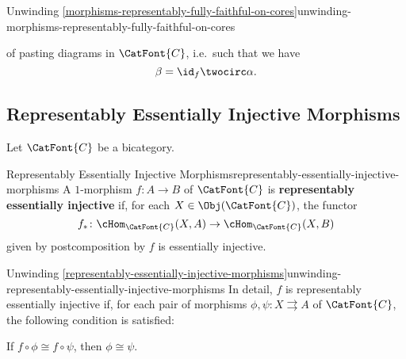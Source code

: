 \begin{remark}{Unwinding \cref{morphisms-representably-fully-faithful-on-cores}}{unwinding-morphisms-representably-fully-faithful-on-cores}
\begin{enumerate}
\begin{webcompile}
\begin{tikzcd}[row sep={5.0*\the\DL,between origins}, column sep={5.0*\the\DL,between origins}, background color=backgroundColor, ampersand replacement=\&]
                    \end{tikzcd}
                \end{webcompile}
                of pasting diagrams in $\CatFont{C}$, i.e.\ such that we have
                \[
                    \beta%
                    =%
                    \id_{f}\twocirc\alpha.%
                \]%
    \end{enumerate}
\end{remark}
\subsection{Representably Essentially Injective Morphisms}\label{subsection-representably-essentially-injective-morphisms}
Let $\CatFont{C}$ be a bicategory.
\begin{definition}{Representably Essentially Injective Morphisms}{representably-essentially-injective-morphisms}%
    A $1$-morphism $f\colon A\to B$ of $\CatFont{C}$ is \textbf{representably essentially injective} if, for each $X\in\Obj(\CatFont{C})$, the functor
    \[
        f_{*}%
        \colon%
        \cHom_{\CatFont{C}}(X,A)%
        \to%
        \cHom_{\CatFont{C}}(X,B)%
    \]%
    given by postcomposition by $f$ is essentially injective.
\end{definition}
\begin{remark}{Unwinding \cref{representably-essentially-injective-morphisms}}{unwinding-representably-essentially-injective-morphisms}%
    In detail, $f$ is representably essentially injective if, for each pair of morphisms $\phi,\psi\colon X\rightrightarrows A$ of $\CatFont{C}$, the following condition is satisfied:
    \begin{itemize}
        \itemstar If $f\circ\phi\cong f\circ\psi$, then $\phi\cong\psi$.
    \end{itemize}
\end{remark}
